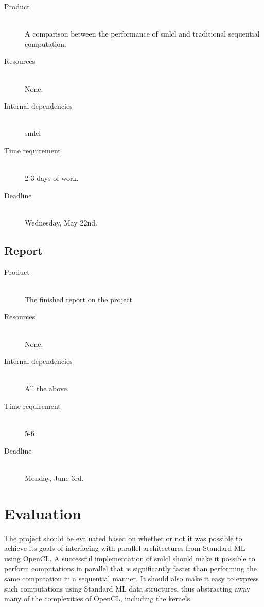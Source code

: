 \documentclass[a4paper, 10pt]{article}
\begin{document}
\begin{description}
  \item[Product] \hfill \\ A comparison between the performance of
    smlcl and traditional sequential computation.
  \item[Resources] \hfill \\
    None.
  \item[Internal dependencies] \hfill \\
    smlcl
  \item[Time requirement] \hfill \\
    2-3 days of work.
  \item[Deadline] \hfill \\
    Wednesday, May 22nd.
\end{description}


\subsection{Report}

\begin{description}
  \item[Product] \hfill \\ The finished report on the project
  \item[Resources] \hfill \\
    None.
  \item[Internal dependencies] \hfill \\
    All the above.
  \item[Time requirement] \hfill \\
    5-6
  \item[Deadline] \hfill \\
    Monday, June 3rd.
\end{description}

\section{Evaluation}

The project should be evaluated based on whether or not it was
possible to achieve its goals of interfacing with parallel
architectures from Standard ML using OpenCL. A successful
implementation of smlcl should make it possible to perform
computations in parallel that is significantly faster than performing
the same computation in a sequential manner. It should also make it
easy to express such computations using Standard ML data structures,
thus abstracting away many of the complexities of OpenCL, including
the kernels.
\end{document}
